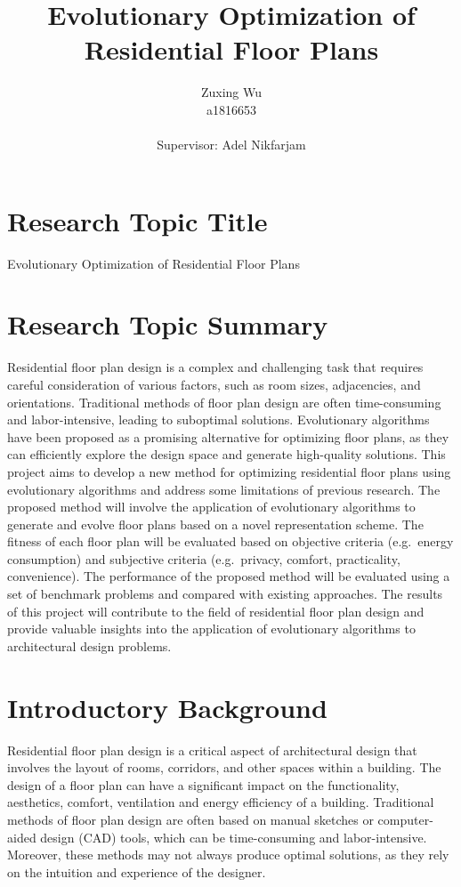 \documentclass[]{article}
\title{Evolutionary Optimization of Residential Floor Plans}
\author{Zuxing Wu\\a1816653\\ \\Supervisor: Adel Nikfarjam\\ }
\begin{document}
\maketitle\nonumber

\newpage\nonumber

\tableofcontents

\newpage

\section{Research Topic Title} 
Evolutionary Optimization of Residential Floor Plans
\section{Research Topic Summary}

Residential floor plan design is a complex and challenging task that requires careful consideration of various factors, such as room sizes, adjacencies, and orientations. Traditional methods of floor plan design are often time-consuming and labor-intensive, leading to suboptimal solutions. Evolutionary algorithms have been proposed as a promising alternative for optimizing floor plans, as they can efficiently explore the design space and generate high-quality solutions. This project aims to develop a new method for optimizing residential floor plans using evolutionary algorithms and address some limitations of previous research. The proposed method will involve the application of evolutionary algorithms to generate and evolve floor plans based on a novel representation scheme. The fitness of each floor plan will be evaluated based on objective criteria (e.g.\ energy consumption) and subjective criteria (e.g.\ privacy, comfort, practicality, convenience). The performance of the proposed method will be evaluated using a set of benchmark problems and compared with existing approaches. The results of this project will contribute to the field of residential floor plan design and provide valuable insights into the application of evolutionary algorithms to architectural design problems.

\section{Introductory Background}
Residential floor plan design is a critical aspect of architectural design that involves the layout of rooms, corridors, and other spaces within a building. The design of a floor plan can have a significant impact on the functionality, aesthetics, comfort, ventilation and energy efficiency of a building. Traditional methods of floor plan design are often based on manual sketches or computer-aided design (CAD) tools, which can be time-consuming and labor-intensive. Moreover, these methods may not always produce optimal solutions, as they rely on the intuition and experience of the designer.
\end{document}
